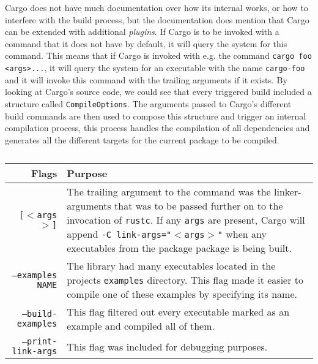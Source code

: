 Cargo does not have much documentation over how its internal works, or how to interfere with the build process, but the documentation does mention that Cargo can be extended with additional \emph{plugins}.
If Cargo is to be invoked with a command that it does not have by default, it will query the system for this command.
This means that if Cargo is invoked with e.g. the command \texttt{cargo foo <args>...}, it will query the system for an executable with the name \texttt{cargo-foo} and it will invoke this command with the trailing arguments if it exists.
By looking at Cargo's source code, we could see that every triggered build included a structure called \texttt{CompileOptions}.
The arguments passed to Cargo's different build commands are then used to compose this structure and trigger an internal compilation process, this process handles the compilation of all dependencies and generates all the different targets for the current package to be compiled.

\begin{table}[ht]
\begin{center}
\begin{tabular}{r|p{8cm}}
\textbf{Flags} & \textbf{Purpose} \\
\hline
\texttt{[$<$args$>$]} &
The trailing argument to the command was the linker-arguments that was to be passed further on to the invocation of \texttt{rustc}.
If any \texttt{args} are present, Cargo will append \texttt{-C link-args="$<$args$>$"} when any executables from the package package is being built. \\

\texttt{--examples NAME} &
The library had many executables located in the projects \texttt{examples} directory.
This flag made it easier to compile one of these examples by specifying its name. \\

\texttt{--build-examples} &
This flag filtered out every executable marked as an example and compiled all of them. \\

\texttt{--print-link-args} &
This flag was included for debugging purposes. \\

\hline
\end{tabular}
\caption{}
\label{tab:cargo_linkargs}
\end{center}
\end{table}


